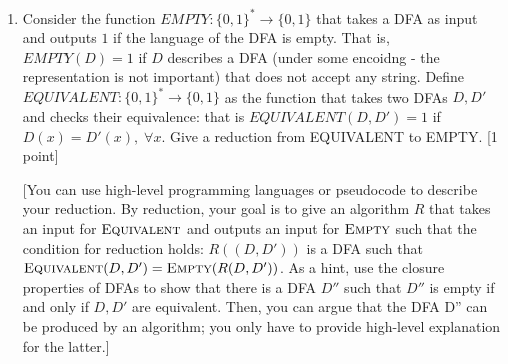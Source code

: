 \documentclass[11pt]{article}
\begin{document}
\begin{enumerate}

\item Consider the function $EMPTY:\{0,1\}^* \rightarrow \{0,1\}$ that takes a DFA as input and outputs $1$ if the language of the DFA is empty. That is, $EMPTY(D) = 1$ if $D$ describes a DFA (under some encoidng - the representation is not important) that does not accept any string. Define $EQUIVALENT:\{0,1\}^* \rightarrow \{0,1\}$ as the function that takes two DFAs $D,D'$ and checks their equivalence: that is $EQUIVALENT(D,D') = 1$ if $D(x) = D'(x),\; \forall x$. Give a reduction from EQUIVALENT to EMPTY. [1 point]

[You can use high-level programming languages or pseudocode to describe your reduction. By reduction, your goal is to give an algorithm $R$ that takes an input for $\textsc{Equivalent}$ and outputs an input for $\textsc{Empty}$ such that the condition for reduction holds: $R((D,D'))$ is a DFA such that $\textsc{Equivalent}(D,D') = \textsc{Empty}(R(D,D'))$. As a hint, use the closure properties of DFAs to show that there is a DFA $D''$ such that $D''$ is empty if and only if $D,D'$ are equivalent. Then, you can argue that the DFA D'' can be produced by an algorithm; you only have to provide high-level explanation for the latter.]
\end{enumerate}
\end{document}
